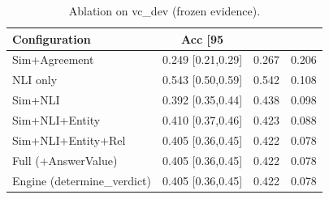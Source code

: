 \begin{table}[t]
\centering
\caption{Ablation on vc_dev (frozen evidence).}
\label{tab:ablation_vc_dev}
\small
\begin{tabular}{lccc}
\hline
Configuration & Acc [95\\%
\hline
Sim+Agreement & 0.249 [0.21,0.29] & 0.267 & 0.206 \\
NLI only & 0.543 [0.50,0.59] & 0.542 & 0.108 \\
Sim+NLI & 0.392 [0.35,0.44] & 0.438 & 0.098 \\
Sim+NLI+Entity & 0.410 [0.37,0.46] & 0.423 & 0.088 \\
Sim+NLI+Entity+Rel & 0.405 [0.36,0.45] & 0.422 & 0.078 \\
Full (+AnswerValue) & 0.405 [0.36,0.45] & 0.422 & 0.078 \\
Engine (determine\_verdict) & 0.405 [0.36,0.45] & 0.422 & 0.078 \\
\hline
\end{tabular}
\end{table}